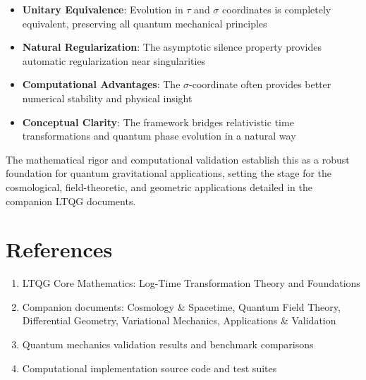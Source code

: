 \documentclass[11pt,a4paper]{article}
\begin{document}
\begin{itemize}
\item \textbf{Unitary Equivalence}: Evolution in $\tau$ and $\sigma$ coordinates is completely equivalent, preserving all quantum mechanical principles

\item \textbf{Natural Regularization}: The asymptotic silence property provides automatic regularization near singularities

\item \textbf{Computational Advantages}: The $\sigma$-coordinate often provides better numerical stability and physical insight

\item \textbf{Conceptual Clarity}: The framework bridges relativistic time transformations and quantum phase evolution in a natural way
\end{itemize}

The mathematical rigor and computational validation establish this as a robust foundation for quantum gravitational applications, setting the stage for the cosmological, field-theoretic, and geometric applications detailed in the companion LTQG documents.

\section*{References}

\begin{enumerate}
\item LTQG Core Mathematics: Log-Time Transformation Theory and Foundations
\item Companion documents: Cosmology \& Spacetime, Quantum Field Theory, Differential Geometry, Variational Mechanics, Applications \& Validation
\item Quantum mechanics validation results and benchmark comparisons
\item Computational implementation source code and test suites
\end{enumerate}
\end{document}
